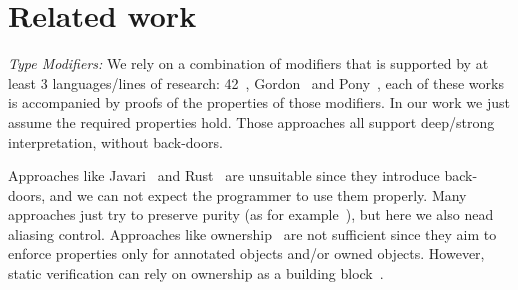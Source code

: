 
\saveSpace
\section{Related work}
\label{s:related}
\saveSpace

\noindent\textit{Type Modifiers:}
We rely on a combination of modifiers that is supported by at least 3 languages/lines of research:
42~\cite{ServettoZucca15,ServettoEtAl13a,JOT:issue_2011_01/article1,GianniniEtAl16},
Gordon~\cite{GordonEtAl12}
and Pony~\cite{clebsch2015deny,clebsch2017orca},
each of these works is accompanied by proofs of the properties of those modifiers.
In our work we just assume the required properties hold.
 Those approaches all support deep/strong interpretation, without back-doors.

Approaches like Javari~\cite{TschantzErnst05,Boyland06} and Rust~\cite{matsakis2014rust}
are unsuitable since they introduce back-doors, and we can not expect the programmer to use them properly.
Many approaches just try to preserve purity (as for example~\cite{pearce2011jpure}),
but here we also nead aliasing control.
Approaches like ownership~\cite{ClarkeEtAl13,ZibinEtAl10,DietlEtAl07}
are not sufficient since they aim to enforce properties only for
annotated objects and/or owned objects.
However, static verification can rely on ownership as a building block~\cite{%
muller2002modular,%
barnett2011specification%
}.%





